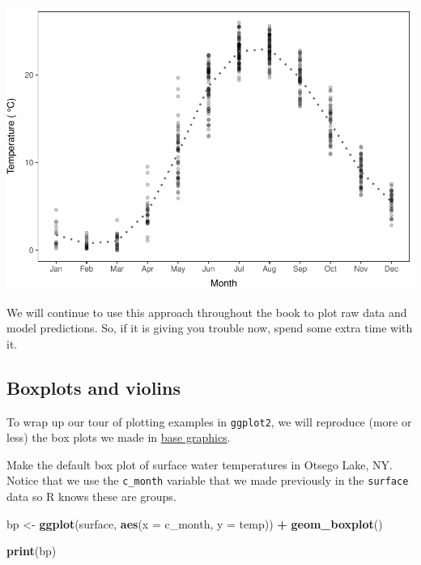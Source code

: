 \documentclass[
]{book}
\newenvironment{Shaded}{\begin{snugshade}}{\end{snugshade}}
\newcommand{\DataTypeTok}[1]{\textcolor[rgb]{0.13,0.29,0.53}{#1}}
\newcommand{\KeywordTok}[1]{\textcolor[rgb]{0.13,0.29,0.53}{\textbf{#1}}}
\newcommand{\NormalTok}[1]{#1}
\newcommand{\OperatorTok}[1]{\textcolor[rgb]{0.81,0.36,0.00}{\textbf{#1}}}
\newcommand{\StringTok}[1]{\textcolor[rgb]{0.31,0.60,0.02}{#1}}
\begin{document}
\includegraphics{worstr_files/figure-latex/unnamed-chunk-111-1.pdf}

We will continue to use this approach throughout the book to plot raw data and model predictions. So, if it is giving you trouble now, spend some extra time with it.

\hypertarget{ggboxplots}{%
\subsection{Boxplots and violins}\label{ggboxplots}}

To wrap up our tour of plotting examples in \texttt{ggplot2}, we will reproduce (more or less) the box plots we made in \protect\hyperlink{boxplots}{base graphics}.

Make the default box plot of surface water temperatures in Otsego Lake, NY. Notice that we use the \texttt{c\_month} variable that we made previously in the \texttt{surface} data so R knows these are groups.

\begin{Shaded}
\begin{Highlighting}[]
\NormalTok{bp <-}\StringTok{ }\KeywordTok{ggplot}\NormalTok{(surface, }\KeywordTok{aes}\NormalTok{(}\DataTypeTok{x =}\NormalTok{ c_month, }\DataTypeTok{y =}\NormalTok{ temp)) }\OperatorTok{+}\StringTok{ }\KeywordTok{geom_boxplot}\NormalTok{()}

\KeywordTok{print}\NormalTok{(bp)}
\end{Highlighting}
\end{Shaded}
\end{document}
